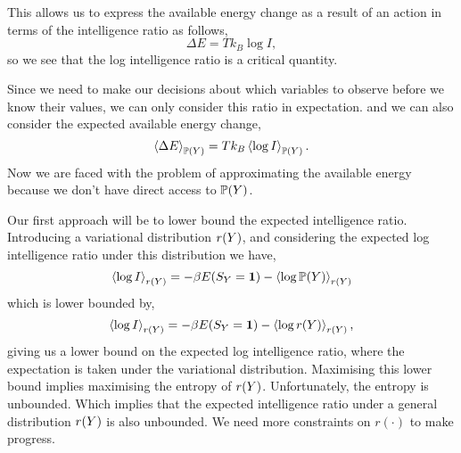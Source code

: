 \documentclass[]{article}
\begin{document}
This allows us to express the available energy change as a result of an action in terms of the intelligence ratio as follows,
\[
\Delta E = T k_B\log I,
\]
so we see that the log intelligence ratio is a critical quantity. 

Since we need to make our decisions about which variables to observe before we know their values, we can only consider this ratio in expectation.
and we can also consider the expected available energy change,
\[
\left\langle \Delta E \right\rangle_{\mathbb{P}(Y)} = T k_B\left\langle \log I \right\rangle_{\mathbb{P}(Y)}.
\]
Now we are faced with the problem of approximating the available energy because we don't have direct access to $\mathbb{P}(Y)$.

Our first approach will be to lower bound the expected intelligence ratio. Introducing a variational distribution $r(Y)$, and considering the expected log intelligence ratio under this distribution we have,
\[
\left\langle \log I \right\rangle_{r(Y)}   = - \beta E(S_Y=\textbf{1}) - \left\langle \log \mathbb{P}(Y) \right\rangle_{r(Y)}
\]
which is lower bounded by,
\[
\left\langle \log I \right\rangle_{r(Y)}   = - \beta E(S_Y=\textbf{1}) - \left\langle \log r(Y) \right\rangle_{r(Y)},
\]
giving us a lower bound on the expected log intelligence ratio, where the expectation is taken under the variational distribution. Maximising this lower bound implies maximising the entropy of $r(Y)$. Unfortunately, the entropy is unbounded. Which implies that the expected intelligence ratio under a general distribution $r(Y)$ is also unbounded. We need more constraints on $r(\cdot)$ to make progress. 
\end{document}
